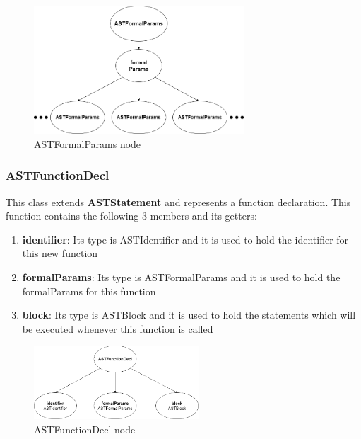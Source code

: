 \documentclass{article}
\begin{document}
					\begin{figure}[H]
					\centering
			 			\includegraphics[width=0.7\textwidth]{astformalparams.png}
			  			\caption{{ASTFormalParams} node}
			  			\label{fig:astformalparams}
					\end{figure}	 
					
					\subsubsection{ASTFunctionDecl}
					
					This class extends \textbf{ASTStatement} and represents a function declaration. This function contains the following 3 members and its getters:
					
							\begin{enumerate}
					\item \textbf{identifier}: Its type is ASTIdentifier and it is used to hold the identifier for this new function
					\item \textbf{formalParams}: Its type is ASTFormalParams and it is used to hold the formalParams for this function
					\item \textbf{block}: Its type is ASTBlock and it is used to hold the statements which will be executed whenever this function is called
				
					\end{enumerate}
					
					\begin{figure}[H]
					\centering
			 			\includegraphics[width=0.55\textwidth]{astfunctiondecl.png}
			  			\caption{{ASTFunctionDecl} node}
			  			\label{fig:astfunctiondecl}
					\end{figure}	 
					
\end{document}
